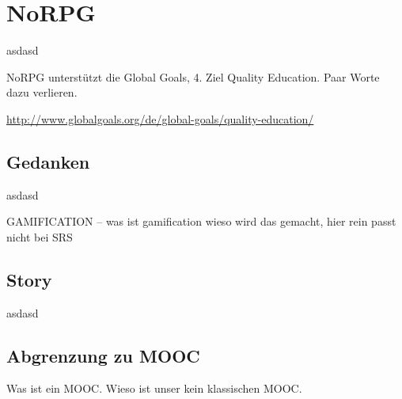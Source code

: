 \chapter{NoRPG}
	asdasd
	
	NoRPG unterstützt die Global Goals, 4. Ziel Quality Education. Paar Worte dazu verlieren. 
	
	\url{http://www.globalgoals.org/de/global-goals/quality-education/}

	
\section{Gedanken}
	asdasd
	
	GAMIFICATION -- was ist gamification wieso wird das gemacht, hier rein passt nicht bei SRS
	
\section{Story}
	asdasd
	
\section{Abgrenzung zu MOOC}
	Was ist ein MOOC. Wieso ist unser kein klassischen MOOC.